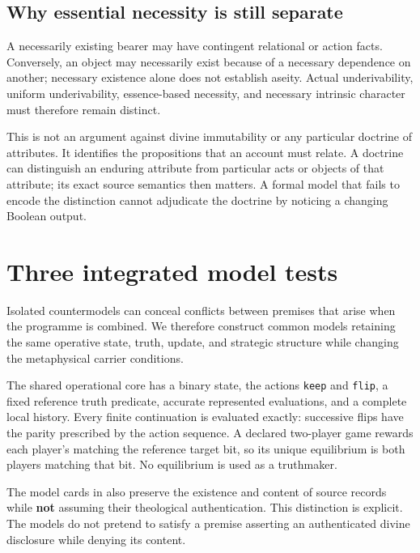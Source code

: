 \documentclass[11pt,a4paper]{article}
\begin{document}
\subsection{Why essential necessity is still
separate}\label{why-essential-necessity-is-still-separate}

A necessarily existing bearer may have contingent relational or action
facts. Conversely, an object may necessarily exist because of a
necessary dependence on another; necessary existence alone does not
establish aseity. Actual underivability, uniform underivability,
essence-based necessity, and necessary intrinsic character must
therefore remain distinct.

This is not an argument against divine immutability or any particular
doctrine of attributes. It identifies the propositions that an account
must relate. A doctrine can distinguish an enduring attribute from
particular acts or objects of that attribute; its exact source semantics
then matters. A formal model that fails to encode the distinction cannot
adjudicate the doctrine by noticing a changing Boolean output.

\section{Three integrated model
tests}\label{three-integrated-model-tests}

Isolated countermodels can conceal conflicts between premises that arise
when the programme is combined. We therefore construct common models
retaining the same operative state, truth, update, and strategic
structure while changing the metaphysical carrier conditions.

The shared operational core has a binary state, the actions
\texttt{keep} and \texttt{flip}, a fixed reference truth predicate,
accurate represented evaluations, and a complete local history. Every
finite continuation is evaluated exactly: successive flips have the
parity prescribed by the action sequence. A declared two-player game
rewards each player's matching the reference target bit, so its unique
equilibrium is both players matching that bit. No equilibrium is used as
a truthmaker.

The model cards in  also
preserve the existence and content of source records while \textbf{not}
assuming their theological authentication. This distinction is explicit.
The models do not pretend to satisfy a premise asserting an
authenticated divine disclosure while denying its content.
\end{document}
